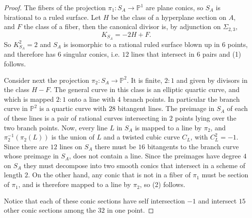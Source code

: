 \documentclass[a4paper,11pt]{amsart}
\theoremstyle{definition}
\numberwithin{equation}{section}
\numberwithin{equation}{section} \theoremstyle{definition}
\begin{document}
\begin{proof} The fibers of the projection $\pi_1:S_A\to {{\mathbb{P}}}^1$ are plane conics, so $S_A$ is birational to a ruled surface.  Let $H$ be the class of a hyperplane section on $A$, and $F$ the class of a fiber, then the canonical divisor is, by adjunction on $\Sigma_{2,3}$, 
\[
K_{S_A}=-2H+F.
\]
So $K_{S_A}^2=2$ and $S_A$ is isomorphic  to a rational ruled surface blown up in $6$ points, and therefore has $6$ singular conics, i.e. $12$ lines that intersect in $6$ pairs and (1) follows. 
  
Consider next the projection $\pi_2:S_A\to {{\mathbb{P}}}^2$.  It is finite, $2:1$ and given by divisors in the class $H-F$.  The general curve in this class is an elliptic quartic curve, and which is mapped $2:1$ onto a line with $4$ branch points.  In particular the branch curve in ${{\mathbb{P}}}^2$ is a quartic curve with $28$ bitangent lines.  The preimage in $S_A$ of each of these lines is a pair of rational curves intersecting in $2$ points lying over the two branch points.
Now, every line $L$ in $S_A$ is mapped to a line by $\pi_2$, and $\pi_2^{-1}(\pi_2(L))$ is the union of $L$ and a twisted cubic curve $C_L$, with $C_L^2=-1$.
Since there are $12$ lines on $S_A$ there must be $16$ bitangents to the branch curve whose preimage in $S_A$, does not contain a line.  Since the preimages have degree $4$ on $S_A$ they must decompose into two smooth conics that intersect in a scheme of length $2$.  On the other hand, any conic that is not in a fiber of $\pi_1$ must be section of $\pi_1$, and is therefore mapped to a line by $\pi_2$, so (2) follows.  

Notice that each of these conic sections have self intersection $-1$ and intersect $15$ other conic sections among the $32$ in one point.


\end{proof}
\end{document}
